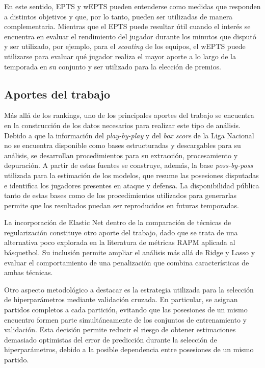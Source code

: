 \documentclass[
  12pt,
]{article}
\begin{document}
En este sentido, EPTS y wEPTS pueden entenderse como medidas que
responden a distintos objetivos y que, por lo tanto, pueden ser
utilizadas de manera complementaria. Mientras que el EPTS puede resultar
útil cuando el interés se encuentra en evaluar el rendimiento del
jugador durante los minutos que disputó y ser utilizado, por ejemplo,
para el \emph{scouting} de los equipos, el wEPTS puede utilizarse para
evaluar qué jugador realiza el mayor aporte a lo largo de la temporada
en su conjunto y ser utilizado para la elección de premios.

\subsection{Aportes del trabajo}\label{aportes-del-trabajo}

Más allá de los rankings, uno de los principales aportes del trabajo se
encuentra en la construcción de los datos necesarios para realizar este
tipo de análisis. Debido a que la información del \emph{play-by-play} y
del \emph{box score} de la Liga Nacional no se encuentra disponible como
bases estructuradas y descargables para su análisis, se desarrollan
procedimientos para su extracción, procesamiento y depuración. A partir
de estas fuentes se construye, además, la base \emph{poss-by-poss}
utilizada para la estimación de los modelos, que resume las posesiones
disputadas e identifica los jugadores presentes en ataque y defensa. La
disponibilidad pública tanto de estas bases como de los procedimientos
utilizados para generarlas permite que los resultados puedan ser
reproducidos en futuras temporadas.

La incorporación de Elastic Net dentro de la comparación de técnicas de
regularización constituye otro aporte del trabajo, dado que se trata de
una alternativa poco explorada en la literatura de métricas RAPM
aplicada al básquetbol. Su inclusión permite ampliar el análisis más
allá de Ridge y Lasso y evaluar el comportamiento de una penalización
que combina características de ambas técnicas.

Otro aspecto metodológico a destacar es la estrategia utilizada para la
selección de hiperparámetros mediante validación cruzada. En particular,
se asignan partidos completos a cada partición, evitando que las
posesiones de un mismo encuentro formen parte simultáneamente de los
conjuntos de entrenamiento y validación. Esta decisión permite reducir
el riesgo de obtener estimaciones demasiado optimistas del error de
predicción durante la selección de hiperparámetros, debido a la posible
dependencia entre posesiones de un mismo partido.
\end{document}

